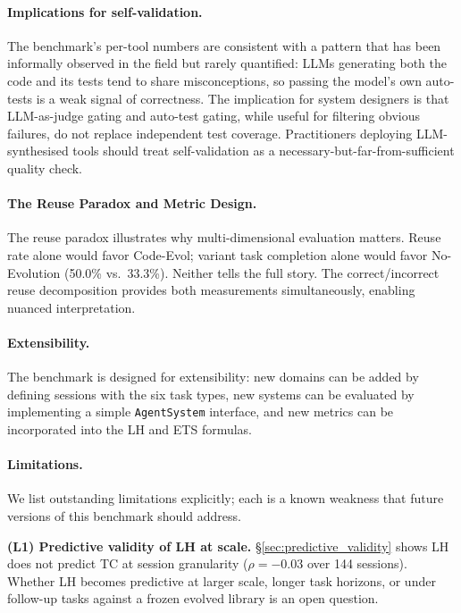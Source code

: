 \documentclass[sigplan,nonacm,natbib=false]{acmart}
\begin{document}
\paragraph{Implications for self-validation.} The benchmark's per-tool numbers are consistent with a pattern that has been informally observed in the field but rarely quantified: LLMs generating both the code and its tests tend to share misconceptions, so passing the model's own auto-tests is a weak signal of correctness. The implication for system designers is that LLM-as-judge gating and auto-test gating, while useful for filtering obvious failures, do not replace independent test coverage. Practitioners deploying LLM-synthesised tools should treat self-validation as a necessary-but-far-from-sufficient quality check.

\paragraph{The Reuse Paradox and Metric Design.} The reuse paradox illustrates why multi-dimensional evaluation matters. Reuse rate alone would favor Code-Evol; variant task completion alone would favor No-Evolution (50.0\% vs.\ 33.3\%). Neither tells the full story. The correct/incorrect reuse decomposition provides both measurements simultaneously, enabling nuanced interpretation.

\paragraph{Extensibility.} The benchmark is designed for extensibility: new domains can be added by defining sessions with the six task types, new systems can be evaluated by implementing a simple \texttt{AgentSystem} interface, and new metrics can be incorporated into the LH and ETS formulas.

\paragraph{Limitations.}
\label{sec:limitations}
We list outstanding limitations explicitly; each is a known weakness that future versions of this benchmark should address.

\noindent\textbf{(L1) Predictive validity of LH at scale.} \S\ref{sec:predictive_validity} shows LH does not predict TC at session granularity ($\rho = -0.03$ over 144 sessions). Whether LH becomes predictive at larger scale, longer task horizons, or under follow-up tasks against a frozen evolved library is an open question.
\end{document}
